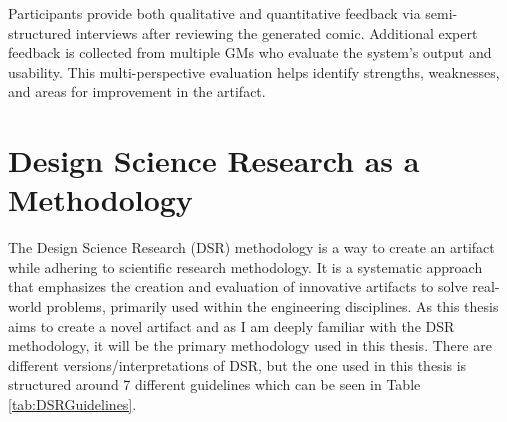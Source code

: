Participants provide both qualitative and quantitative feedback via semi-structured interviews after reviewing the generated comic. Additional expert feedback is collected from multiple GMs who evaluate the system's output and usability. This multi-perspective evaluation helps identify strengths, weaknesses, and areas for improvement in the artifact.

\section{Design Science Research as a Methodology}
The Design Science Research (DSR) methodology is a way to create an artifact while adhering to scientific research methodology\cite{dresch2015design}. It is a systematic approach that emphasizes the creation and evaluation of innovative artifacts to solve real-world problems, primarily used within the engineering disciplines. As this thesis aims to create a novel artifact and as I am deeply familiar with the DSR methodology, it will be the primary methodology used in this thesis. There are different versions/interpretations of DSR, but the one used in this thesis is structured around 7 different guidelines\cite{hevner2004design} which can be seen in Table \ref{tab:DSRGuidelines}. 

